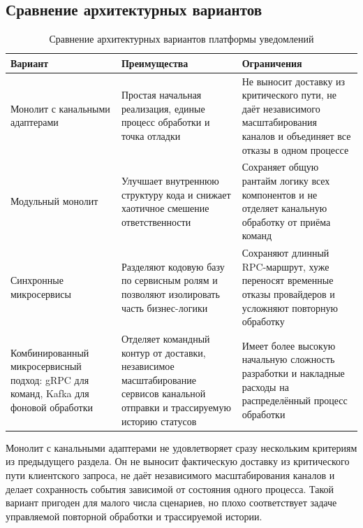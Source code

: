 \subsection{Сравнение архитектурных вариантов}

\begin{table}[H]
    \centering
    \footnotesize
    \renewcommand{\arraystretch}{1.15}
    \caption{Сравнение архитектурных вариантов платформы уведомлений}
    \label{tab:architecture-variants}
    \begin{tabular}{|L{0.24\textwidth}|L{0.29\textwidth}|L{0.31\textwidth}|}
        \hline
        \textbf{Вариант} & \textbf{Преимущества} & \textbf{Ограничения} \\
        \hline
        Монолит с канальными адаптерами & Простая начальная реализация, единые процесс обработки и точка отладки & Не выносит доставку из критического пути, не даёт независимого масштабирования каналов и объединяет все отказы в одном процессе \\
        \hline
        Модульный монолит & Улучшает внутреннюю структуру кода и снижает хаотичное смешение ответственности & Сохраняет общую рантайм логику всех компонентов и не отделяет канальную обработку от приёма команд \\
        \hline
        Синхронные микросервисы & Разделяют кодовую базу по сервисным ролям и позволяют изолировать часть бизнес-логики & Сохраняют длинный RPC-маршрут, хуже переносят временные отказы провайдеров и усложняют повторную обработку \\
        \hline
        Комбинированный микросервисный подход: gRPC для команд, Kafka для фоновой обработки & Отделяет командный контур от доставки, независимое масштабирование сервисов канальной отправки и трассируемую историю статусов & Имеет более высокую начальную сложность разработки и накладные расходы на распределённый процесс обработки\\
        \hline
    \end{tabular}
\end{table}

Монолит с канальными адаптерами не удовлетворяет сразу нескольким критериям из предыдущего раздела. Он не выносит фактическую доставку из критического пути клиентского запроса, не даёт независимого масштабирования каналов и делает сохранность события зависимой от состояния одного процесса. Такой вариант пригоден для малого числа сценариев, но плохо соответствует задаче управляемой повторной обработки и трассируемой истории.

